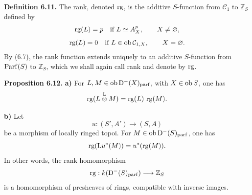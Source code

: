 \textbf{Definition 6.11.} The rank, denoted \(\rg\), is the additive \(S\)-function from \(\mathcal C_1\) to \(\mathbb Z_S\) defined by
\[
  \rg(L)=p\quad\text{if } L\simeq A_X^p,
  \qquad X\ne\varnothing,
\]
\[
  \rg(L)=0\quad\text{if } L\in\Ob\mathcal C_{1,X},
  \qquad X=\varnothing.
\]
By (6.7), the rank function extends uniquely to an additive \(S\)-function from \(\Parf(S)\) to \(\mathbb Z_S\), which we shall again call rank and denote by \(\rg\).

\textbf{Proposition 6.12.} \textbf{a)} For \(L,M\in\Ob\Dpx^-(X)_{\mathrm{parf}}\), with \(X\in\Ob S\), one has
\[
  \rg(L\overset{\mathrm L}{\otimes} M)=\rg(L)\,\rg(M).
\]

\textbf{b)} Let
\[
  u:(S',A')\longrightarrow(S,A)
\]
be a morphism of locally ringed topoi. For \(M\in\Ob\Dpx^-(S)_{\mathrm{parf}}\), one has
\[
  \rg(\mathrm L u^*(M))=u^*(\rg(M)).
\]
In other words, the rank homomorphism
\[
  \rg:k(\Dpx^-(S)_{\mathrm{parf}})\longrightarrow \mathbb Z_S
\]
is a homomorphism of presheaves of rings, compatible with inverse images.



\providecommand{\Cpx}{\mathrm C}
\providecommand{\Kpx}{\mathrm K}
\providecommand{\Dpx}{\mathrm D}
\providecommand{\Ho}{\mathrm H}
\providecommand{\RHom}{\mathrm R\!\operatorname{Hom}}
\providecommand{\Ob}{\operatorname{ob}}
\providecommand{\Hom}{\operatorname{Hom}}
\providecommand{\RHom}{\mathrm R\!\operatorname{Hom}}
\providecommand{\Ext}{\operatorname{Ext}}
\providecommand{\Tor}{\operatorname{Tor}}
\providecommand{\Tr}{\operatorname{Tr}}
\providecommand{\Add}{\operatorname{Add}}
\providecommand{\Cart}{\operatorname{Cart}}
\providecommand{\Parf}{\operatorname{Parf}}
\providecommand{\coh}{\operatorname{coh}}
\providecommand{\amp}{\operatorname{amp}}
\providecommand{\cl}{\operatorname{cl}}
\providecommand{\rg}{\operatorname{rg}}
\providecommand{\Id}{\operatorname{Id}}
\providecommand{\Ker}{\operatorname{Ker}}
\providecommand{\Im}{\operatorname{Im}}
\providecommand{\cH}{\mathcal H}
\providecommand{\Zs}{\mathbb Z_S}
\providecommand{\A}{\mathcal A}
\providecommand{\cC}{\mathcal C}
\providecommand{\cCzero}{\mathcal C_0}
\providecommand{\otL}{\mathop{\otimes}^{\mathrm L}}
\providecommand{\tamp}{\operatorname{tor.amp}}
\providecommand{\pamp}{\operatorname{parf.amp}}
\providecommand{\pdim}{\operatorname{parf.dim}}
\providecommand{\bon}{\mathrm b}
\providecommand{\parf}{\operatorname{parf}}
\providecommand{\parff}{\operatorname{parf}}
\providecommand{\ac}{\mathrm{ac}}



